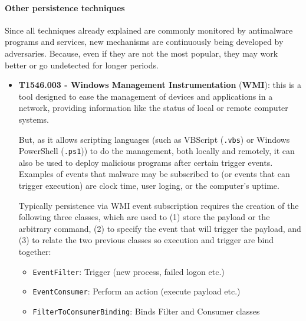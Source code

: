 \paragraph{Other persistence techniques}
Since all techniques already explained are commonly monitored by antimalware programs and services, new mechanisms are continuously being developed by adversaries. Because, even if they are not the most popular, they may work better or go undetected for longer periods.
\begin{itemize}
\item \textbf{T1546.003 - Windows Management Instrumentation} (\textbf{WMI}): this is a tool designed to ease the management of devices and applications in a network, providing information like the status of local or remote computer systems. 

But, as it allows scripting languages (such as VBScript (\texttt{.vbs}) or Windows PowerShell (\texttt{.ps1})) to do the management, both locally and remotely, it can also be used to deploy malicious programs after certain trigger events. Examples of events that malware may be subscribed to (or events that can trigger execution) are clock time, user loging, or the computer's uptime.

Typically persistence via WMI event subscription requires the creation of the following three classes, which are used to (1) store the payload or the arbitrary command, (2) to specify the event that will trigger the payload, and (3) to relate the two previous classes so execution and trigger are bind together\cite{WMIPersistence}:

\begin{itemize}
\item \texttt{EventFilter}: Trigger (new process, failed logon etc.)
\item \texttt{EventConsumer}: Perform an action (execute payload etc.)
\item \texttt{FilterToConsumerBinding}: Binds Filter and Consumer classes
\end{itemize}


\end{itemize}
